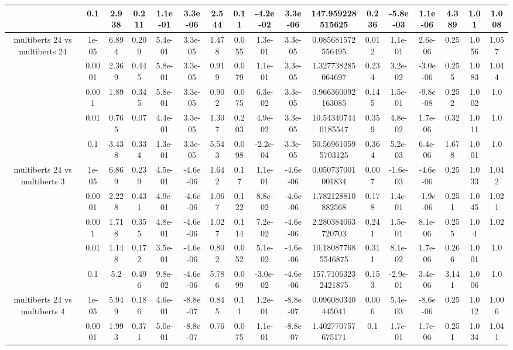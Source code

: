 \begin{tabular}{|c|c|c|c|c|c|c|c|c|c|c|c|c|c|c|c|c|}
 & 0.1 & 2.938 & 0.211 & 1.1e-01 & 3.3e-06 & 2.544 & 0.11 & -4.2e-02 & 3.3e-06 & 147.959228515625 & 0.236 & -5.8e-03 & 1.1e-06 & 4.389 & 1.01 & 1.008 \\
\hline
\multirow{5}{*}{multiberts 24 vs multiberts 24} & 1e-05 & 6.894 & 0.209 & 5.4e-01 & 3.3e-05 & 1.478 & 0.055 & 1.3e-01 & 3.3e-05 & 0.085681572556495 & 0.012 & 1.1e-01 & 2.6e-06 & 0.25 & 1.056 & 1.057 \\
 & 0.0001 & 2.369 & 0.445 & 5.8e-01 & 3.3e-05 & 0.919 & 0.079 & 1.1e-01 & 3.3e-05 & 1.327738285064697 & 0.234 & 3.2e-02 & -3.0e-06 & 0.255 & 1.083 & 1.044 \\
 & 0.001 & 1.89 & 0.345 & 5.8e-01 & 3.3e-05 & 0.902 & 0.075 & 6.3e-02 & 3.3e-05 & 0.966360092163085 & 0.145 & 1.5e-01 & -9.8e-08 & 0.252 & 1.002 & 1.0 \\
 & 0.01 & 0.765 & 0.07 & 4.4e-01 & 3.3e-05 & 1.307 & 0.203 & 4.9e-02 & 3.3e-05 & 10.543407440185547 & 0.359 & 4.8e-02 & 1.7e-06 & 0.32 & 1.011 & 1.0 \\
 & 0.1 & 3.438 & 0.334 & 1.3e-01 & 3.3e-05 & 5.543 & 0.098 & -2.2e-04 & 3.3e-05 & 50.569610595703125 & 0.364 & 5.2e-03 & 6.4e-06 & 1.678 & 1.001 & 1.0 \\
\hline
\multirow{5}{*}{multiberts 24 vs multiberts 3} & 1e-05 & 6.869 & 0.239 & 4.5e-01 & -4.6e-06 & 1.642 & 0.17 & 1.1e-01 & -4.6e-06 & 0.050737001001834 & 0.007 & -1.6e-03 & -4.6e-06 & 0.25 & 1.033 & 1.042 \\
 & 0.0001 & 2.228 & 0.431 & 4.9e-01 & -4.6e-06 & 1.067 & 0.122 & 8.8e-02 & -4.6e-06 & 1.782128810882568 & 0.178 & 1.4e-01 & -1.9e-06 & 0.251 & 1.045 & 1.021 \\
 & 0.001 & 1.718 & 0.355 & 4.8e-01 & -4.6e-06 & 1.027 & 0.114 & 7.2e-02 & -4.6e-06 & 2.280384063720703 & 0.241 & 1.5e-01 & 8.1e-06 & 0.255 & 1.04 & 1.02 \\
 & 0.01 & 1.148 & 0.172 & 3.5e-01 & -4.6e-06 & 0.802 & 0.052 & 5.1e-02 & -4.6e-06 & 10.180877685546875 & 0.311 & 8.1e-02 & 1.7e-06 & 0.266 & 1.001 & 1.0 \\
 & 0.1 & 5.2 & 0.496 & 9.8e-02 & -4.6e-06 & 5.786 & 0.099 & -3.0e-02 & -4.6e-06 & 157.71063232421875 & 0.153 & -2.9e-01 & 3.4e-06 & 3.141 & 1.006 & 1.0 \\
\hline
\multirow{5}{*}{multiberts 24 vs multiberts 4} & 1e-05 & 5.949 & 0.186 & 4.6e-01 & -8.8e-07 & 0.845 & 0.11 & 1.2e-01 & -8.8e-07 & 0.096080340445041 & 0.006 & 5.4e-03 & -8.6e-06 & 0.25 & 1.012 & 1.006 \\
 & 0.0001 & 1.993 & 0.371 & 5.0e-01 & -8.8e-07 & 0.76 & 0.075 & 1.1e-01 & -8.8e-07 & 1.402770757675171 & 0.1 & 1.7e-01 & 1.7e-06 & 0.251 & 1.034 & 1.041 \\

\end{tabular}
